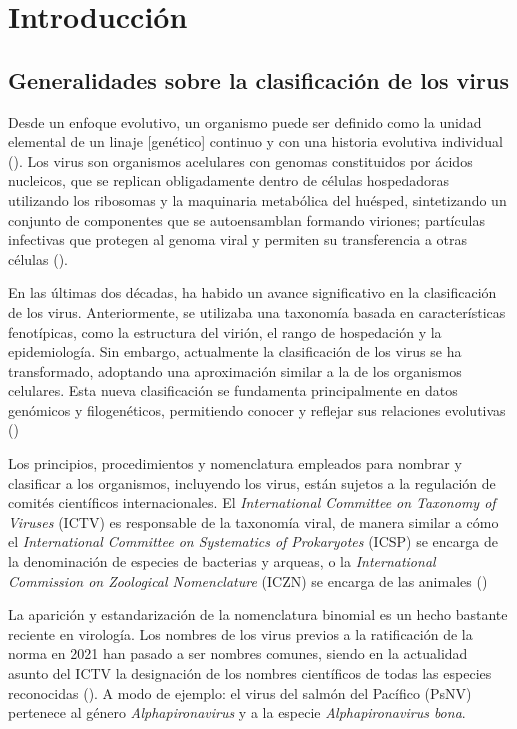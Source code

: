 \section{Introducción}

\subsection{Generalidades sobre la clasificación de los virus}

Desde un enfoque evolutivo, un organismo puede ser definido como la unidad 
elemental de un linaje [genético] continuo y con una historia evolutiva 
individual (\cite{luria_general_1978}). Los virus son organismos acelulares 
con genomas constituidos por ácidos nucleicos, que se replican obligadamente 
dentro de células hospedadoras utilizando los ribosomas y la maquinaria 
metabólica del huésped, sintetizando un conjunto de componentes que se 
autoensamblan formando viriones; partículas infectivas que protegen al 
genoma viral y permiten su transferencia a otras células 
(\cite{claverie_giant_2016,koonin_viruses_2021,nasir_investigating_2020,
rybicki_chapter_2023}).

En las últimas dos décadas, ha habido un avance significativo en la 
clasificación de los virus. Anteriormente, se utilizaba una taxonomía basada 
en características fenotípicas, como la estructura del virión, el rango de 
hospedación y la epidemiología. Sin embargo, actualmente la clasificación 
de los virus se ha transformado, adoptando una aproximación similar a la de 
los organismos celulares. Esta nueva clasificación se fundamenta 
principalmente en datos genómicos y filogenéticos, permitiendo conocer y 
reflejar sus relaciones evolutivas 
(\cite{koonin_origins_2015,koonin_global_2020,simmonds_virus_2017})

Los principios, procedimientos y nomenclatura empleados para nombrar y 
clasificar a los organismos, incluyendo los virus, están sujetos a la 
regulación de comités científicos internacionales. El \textit{International 
Committee on Taxonomy of Viruses} (ICTV) es responsable de la taxonomía 
viral, de manera similar a cómo el \textit{International Committee on 
Systematics of Prokaryotes} (ICSP) se encarga de la denominación de especies 
de bacterias y arqueas, o la \textit{International Commission on Zoological 
Nomenclature} (ICZN) se encarga de las animales 
(\cite{iczn_about_nodate,lefkowitz_virus_2018,oren_international_2023})

La aparición y estandarización de la nomenclatura binomial es un hecho 
bastante reciente en virología. Los nombres de los virus previos a la 
ratificación de la norma en 2021 han pasado a ser nombres comunes, siendo en
la actualidad asunto del ICTV la designación de los nombres científicos de 
todas las especies reconocidas (\cite{zerbini_differentiating_2022}). 
A modo de ejemplo: el virus del salmón del Pacífico (PsNV) pertenece al 
género \textit{Alphapironavirus} y a la especie \textit{Alphapironavirus 
bona}.

